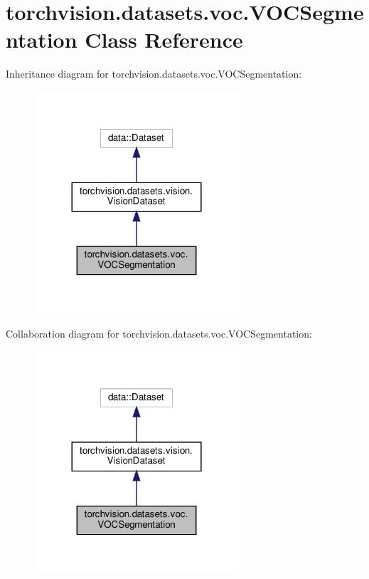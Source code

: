 \hypertarget{classtorchvision_1_1datasets_1_1voc_1_1VOCSegmentation}{}\section{torchvision.\+datasets.\+voc.\+V\+O\+C\+Segmentation Class Reference}
\label{classtorchvision_1_1datasets_1_1voc_1_1VOCSegmentation}


Inheritance diagram for torchvision.\+datasets.\+voc.\+V\+O\+C\+Segmentation\+:
\nopagebreak
\begin{figure}[H]
\begin{center}
\leavevmode
\includegraphics[width=216pt]{classtorchvision_1_1datasets_1_1voc_1_1VOCSegmentation__inherit__graph}
\end{center}
\end{figure}


Collaboration diagram for torchvision.\+datasets.\+voc.\+V\+O\+C\+Segmentation\+:
\nopagebreak
\begin{figure}[H]
\begin{center}
\leavevmode
\includegraphics[width=216pt]{classtorchvision_1_1datasets_1_1voc_1_1VOCSegmentation__coll__graph}
\end{center}
\end{figure}
